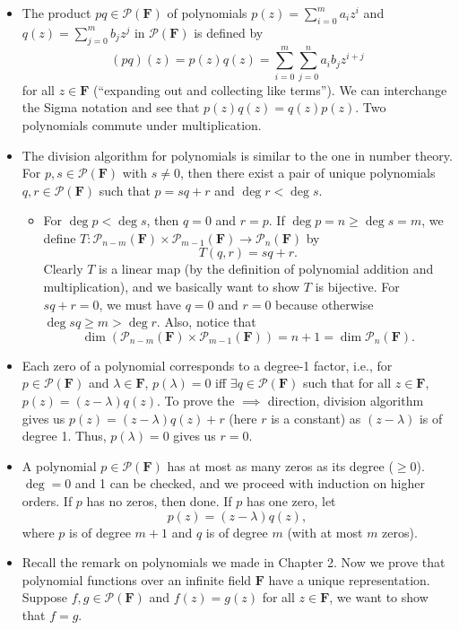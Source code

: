 \documentclass[11pt]{article}
\newcommand{\F}{\mathbf{F}}
\renewcommand{\d}{\dim}
\newcommand{\PF}{\mathcal{P}(\F)}
\begin{document}
\begin{itemize}
	\item The product $pq \in \PF$ of polynomials $p(z)=\sum_{i=0}^m a_iz^i$ and $q(z)=\sum_{j=0}^m b_jz^j$ in $\PF$ is defined by $$(pq)(z) = p(z)q(z) = \sum_{i=0}^m\sum_{j=0}^n a_i b_j z^{i+j}$$ for all $z \in \F$ (``expanding out and collecting like terms''). We can interchange the Sigma notation and see that $p(z)q(z) = q(z)p(z)$. Two polynomials commute under multiplication.
    \item The division algorithm for polynomials is similar to the one in number theory. For $p,s \in \mathcal{P}(\F)$ with $s \not= 0$, then there exist a pair of unique polynomials $q,r \in \mathcal{P}(\F)$ such that $p=sq+r$ and $\deg r < \deg s$.
    \begin{itemize}
        \item For $\deg p < \deg s$, then $q = 0$ and $r = p$. If $\deg p = n \geq \deg s = m$, we define $T: \mathcal{P}_{n-m}(\F) \times \mathcal{P}_{m-1}(\F) \to \mathcal{P}_n(\F)$ by $$T(q,r) = sq+r.$$
        Clearly $T$ is a linear map (by the definition of polynomial addition and multiplication), and we basically want to show $T$ is bijective. For $sq+r=0$, we must have $q=0$ and $r=0$ because otherwise $\deg sq \geq m > \deg r$. Also, notice that $$\d(\mathcal{P}_{n-m}(\F) \times \mathcal{P}_{m-1}(\F)) = n+1 = \d \mathcal{P}_n(\F).$$
    \end{itemize}
    \item Each zero of a polynomial corresponds to a degree-1 factor, i.e., for $p \in \PF$ and $\lambda \in \F$, $p(\lambda) = 0$ iff $\exists q \in \PF$ such that for all $z \in \F$, $p(z) = (z-\lambda)q(z)$. To prove the $\implies$ direction, division algorithm gives us $p(z) = (z-\lambda)q(z) + r$ (here $r$ is a constant) as $(z-\lambda)$ is of degree 1. Thus, $p(\lambda) = 0$ gives us $r=0$.
    
    \item A polynomial $p \in \PF$ has at most as many zeros as its degree ($\geq 0$). $\deg = 0$ and 1 can be checked, and we proceed with induction on higher orders. If $p$ has no zeros, then done. If $p$ has one zero, let $$p(z) = (z-\lambda)q(z),$$ where $p$ is of degree $m+1$ and $q$ is of degree $m$ (with at most $m$ zeros).
    
    \item Recall the remark on polynomials we made in Chapter 2. Now we prove that polynomial functions over an infinite field $\F$ have a unique representation. Suppose $f,g \in \PF$ and $f(z)=g(z)$ for all $z \in \F$, we want to show that $f=g$.
    

\end{itemize}
\end{document}

